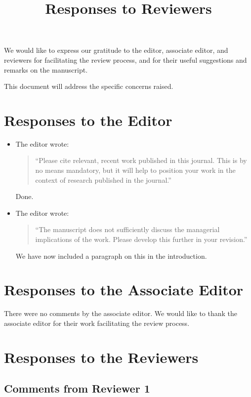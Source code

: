 \documentclass{article}
\title{Responses to Reviewers}
\author{}
\date{}
\begin{document}
\maketitle

We would like to express our gratitude to the editor, associate editor, and reviewers for facilitating the review process, and for their useful suggestions and remarks on the manuscript.

This document will address the specific concerns raised.

\section{Responses to the Editor}

\begin{itemize}

\item The editor wrote:
\begin{quote}
``Please cite relevant, recent work published in this journal. This is by no means mandatory, but it will help to position your work in the context of research published in the journal.''
\end{quote}
Done.


\item The editor wrote:
\begin{quote}
``The manuscript does not sufficiently discuss the managerial implications of the work. Please develop this further in your revision.''
\end{quote}
We have now included a paragraph on this in the introduction.

\end{itemize}


\section{Responses to the Associate Editor}
There were no comments by the associate editor. We would like to thank the associate editor for their work facilitating the review process.

\section{Responses to the Reviewers}

\subsection{Comments from Reviewer 1}
\end{document}
